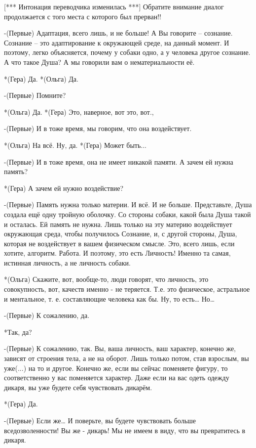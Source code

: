 [*** Интонация переводчика изменилась ***]
Обратите внимание диалог продолжается с того места с которого был прерван!!

-(Первые) Адаптация, всего лишь, и не больше! А Вы говорите – сознание. Сознание – это  адаптирование к окружающей среде, на данный момент. И поэтому, легко объясняется, почему у собаки одно, а у человека другое сознание. А что такое Душа? А мы говорили вам о нематериальности её.

*(Гера) Да.
*(Ольга) Да.

-(Первые) Помните?

*(Ольга) Да.
*(Гера) Это, наверное, вот это, вот.,

-(Первые) И в тоже время, мы говорим, что она воздействует.

*(Ольга) На всё. Ну, да.
*(Гера) Может быть...

-(Первые) И в тоже время, она не имеет никакой памяти. А зачем ей нужна память?

*(Гера) А зачем ей нужно воздействие?

-(Первые) Память нужна только материи. И всё. И не больше. Представьте, Душа создала ещё одну тройную оболочку. Со стороны собаки, какой была Душа такой и осталась. Ей память не нужна. Лишь только на эту материю воздействует окружающая среда, чтобы получилось Сознание, и, с другой стороны, Душа, которая не воздействует в вашем физическом смысле. Это, всего лишь, если хотите, алгоритм. Работа. И поэтому, это есть Личность! Именно та самая, истинная личность, а не личность собаки.

*(Ольга) Скажите, вот, вообще-то, люди говорят, что личность, это совокупность, вот, качеств именно - не теряется. Т.е. это физическое, астральное и ментальное, т. е. составляющие человека как бы. Ну, то есть… Но…

-(Первые) К сожалению, да. 

*Так, да?

-(Первые) К сожалению, так. Вы, ваша личность, ваш характер, конечно же, зависят от строения тела, а не на оборот. Лишь только потом, став взрослым, вы уже(...) на то и другое. Конечно же, если вы сейчас поменяете фигуру, то соответственно у вас поменяется характер. Даже если на вас одеть одежду дикаря, вы уже будете себя чувствовать дикарём.

*(Гера) Да. 

-(Первые) Если же… И поверьте, вы будете чувствовать больше вседозволенности! Вы же - дикарь! Мы не имеем в виду, что вы превратитесь в дикаря.


